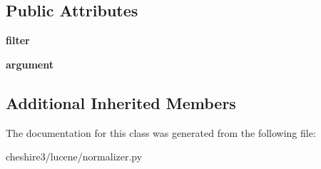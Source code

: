 \subsection*{Public Attributes}
\begin{DoxyCompactItemize}
\item 
\hypertarget{classcheshire3_1_1lucene_1_1normalizer_1_1_filter_normalizer_afef81e41d8f516781845834a3ff319ff}{{\bfseries filter}}\label{classcheshire3_1_1lucene_1_1normalizer_1_1_filter_normalizer_afef81e41d8f516781845834a3ff319ff}

\item 
\hypertarget{classcheshire3_1_1lucene_1_1normalizer_1_1_filter_normalizer_ada9a8e59325dcffbe64098ec76b08dc0}{{\bfseries argument}}\label{classcheshire3_1_1lucene_1_1normalizer_1_1_filter_normalizer_ada9a8e59325dcffbe64098ec76b08dc0}

\end{DoxyCompactItemize}
\subsection*{Additional Inherited Members}


The documentation for this class was generated from the following file\-:\begin{DoxyCompactItemize}
\item 
cheshire3/lucene/normalizer.\-py\end{DoxyCompactItemize}
